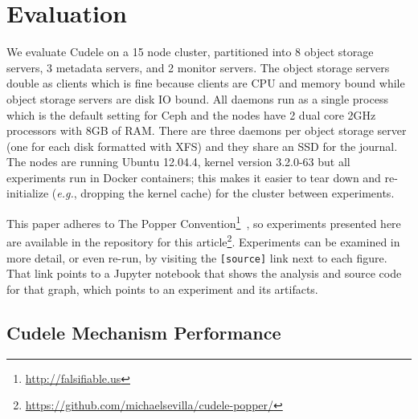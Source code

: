 \section{Evaluation}
\label{sec:evaluation}

We evaluate Cudele on a 15 node cluster, partitioned into 8 object storage
servers, 3 metadata servers, and 2 monitor servers. The object storage servers
double as clients which is fine because clients are CPU and memory bound while
object storage servers are disk IO bound. All daemons run as a single process
which is the default setting for Ceph and the nodes have 2 dual core 2GHz
processors with 8GB of RAM. There are three daemons per object storage server
(one for each disk formatted with XFS) and they share an SSD for the journal.
The nodes are running Ubuntu 12.04.4, kernel version 3.2.0-63 but all
experiments run in Docker containers; this makes it easier to tear down and
re-initialize ({\it e.g.}, dropping the kernel cache) for the cluster between
experiments.

This paper adheres to The Popper
Convention\footnote{\url{http://falsifiable.us}}~\cite{jimenez_popper_2016}, so
experiments presented here are available in the repository for this
article\footnote{\url{https://github.com/michaelsevilla/cudele-popper/}}.
Experiments can be examined in more detail, or even re-run, by visiting the
\texttt{[source]} link next to each figure. That link points to a Jupyter
notebook that shows the analysis and source code for that graph, which points
to an experiment and its artifacts.


\subsection{Cudele Mechanism Performance}

